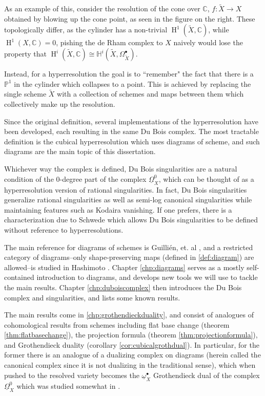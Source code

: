 \documentclass[proquest]{uwthesis}[2014/11/13]
\theoremstyle{definition}
\DeclareMathOperator{\Ho}{H}
\newcommand{\CC}{\mathbb{C}}
\newcommand{\HH}{\mathbb{H}}
\newcommand{\PP}{\mathbb{P}}
\newcommand{\DB}{\underline{\Omega}}
\newcommand{\db}{\underline{\omega}^\bullet}
\begin{document}
As an example of this, consider the resolution of the cone over $\CC$, $f : \tilde{X} \rightarrow X$ obtained by blowing up the cone point, as seen in the figure on the right.
These topologically differ, as the cylinder has a non-trivial $\Ho^1 (\tilde{X}, \CC)$, while $\Ho^1 (X, \CC) = 0$, pishing the de Rham complex to $X$ naively would lose the property that $\Ho^i ( \tilde{X}, \CC) \cong \HH^i (\tilde{X}, \Omega_{\tilde{X}}^\bullet)$.

Instead, for a hyperresolution the goal is to ``remember" the fact that there is a $\PP^1$ in the cylinder which collapses to a point.
This is achieved by replacing the single scheme $\tilde{X}$ with a collection of schemes and maps between them which collectively make up the resolution.

Since the original definition, several implementations of the hyperresolution have been developed, each resulting in the same Du Bois complex. The most tractable definition is the cubical hyperresolution which uses diagrams of scheme, and such diagrams are the main topic of this dissertation.

Whichever way the complex is defined, Du Bois singularities are a natural condition of the 0-degree part of the complex $\DB_X^0$, which can be thought of as a hyperresolution version of rational singularities. In fact, Du Bois singularities generalize rational singularities as well as semi-log canonical singularities while maintaining features such as Kodaira vanishing.
If one prefers, there is a characterization due to Schwede \cite{Schwede2007} which allows Du Bois singularities to be defined without reference to hyperresolutions.

The main reference for diagrams of schemes is Guilli\'en, et. al \cite{Guillen1988}, and a restricted category of diagrams--only shape-preserving maps (defined in \ref{def:diagram}) are allowed--is studied in Hashimoto \cite{Lipman2009}.
Chapter \ref{chp:diagrams} serves as a mostly self-contained introduction to diagrams, and develops new tools we will use to tackle the main results.
Chapter \ref{chp:duboiscomplex} then introduces the Du Bois complex and singularities, and lists some known results.

The main results come in \ref{chp:grothendieckduality}, and consist of analogues of cohomological results from schemes including flat base change (theorem \ref{thm:flatbasechange}), the projection formula (theorem \ref{thm:projectionformula}), and Grothendieck duality (corollary \ref{cor:cubicalgrothdual}).
In particular, for the former there is an analogue of a dualizing complex on diagrams (herein called the canonical complex since it is not dualizing in the traditional sense), which when pushed to the resolved variety becomes the $\db_X$ Grothendieck dual of the complex $\DB_X^0$ which was studied somewhat in \cite{Kovacs2011a}.
\end{document}
